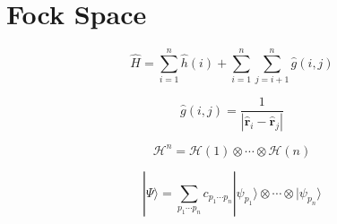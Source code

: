 \section{Fock Space}

\begin{equation}
    \hat{H}
    =
    \sum_{i=1}^n
    \hat{h}(i)
    +
    \sum_{i=1}^n
    \sum_{j=i+1}^n
    \hat{g}(i,j)
\end{equation}

\begin{equation}
    \hat{g}(i,j)
    =
    \frac{1}{|\hat{\mathbf{r}}_i-\hat{\mathbf{r}}_j|}
\end{equation}

\begin{equation}
    \mathcal{H}^n
    =
    \mathcal{H}(1)\otimes\cdots\otimes\mathcal{H}(n)
\end{equation}

\begin{equation}
    |\Psi\rangle
    =
    \sum_{p_1\cdots p_n}
    c_{p_1\cdots p_n}
    |\psi_{p_1}\rangle
    \otimes
    \cdots
    \otimes
    |\psi_{p_n}\rangle
\end{equation}
